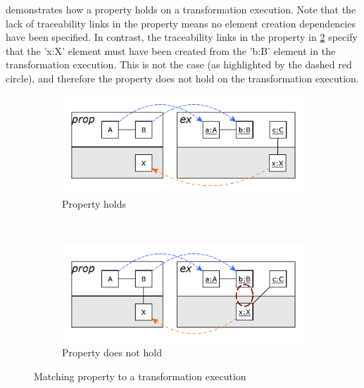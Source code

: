  demonstrates how a property holds on a transformation execution. Note that the lack of traceability links in the property means no element creation dependencies have been specified. In contrast, the traceability links in the property in \cref{fig:prop_execution_with_traceability} specify that the 'x:X' element must have been created from the 'b:B' element in the transformation execution. This is not the case (as highlighted by the dashed red circle), and therefore the property does not hold on the transformation execution.

\begin{figure}[htb]
        \centering
        \begin{subfigure}[b]{0.40\textwidth}
                \centering
                \includegraphics[width=1\textwidth]{./figures/property_proving/prop_execution_without_traceability.pdf}
                \caption{Property holds}
                \label{fig:prop_execution_without_traceability}
        \end{subfigure}%
        \\
        \begin{subfigure}[b]{0.40\textwidth}
                \centering
                \includegraphics[width=1\textwidth]{./figures/property_proving/prop_execution_with_traceability.pdf}
                \caption{Property does not hold}
                \label{fig:prop_execution_with_traceability}
        \end{subfigure}%
        \caption{Matching property to a transformation execution}
        \label{fig:prop_execution}
\end{figure}

